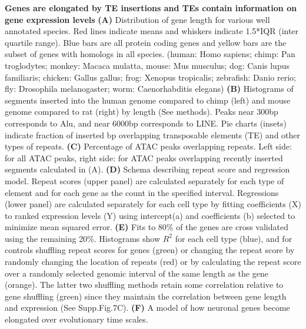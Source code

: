 \textbf{Genes are elongated by TE insertions and TEs contain information on gene expression levels}
\textbf{(A)} Distribution of gene length for various well annotated species. Red lines indicate means and whiskers indicate 1.5*IQR (inter quartile range). Blue bars are all protein coding genes and yellow bars are the subset of genes with homologs in all species. (human: Homo sapiens; chimp: Pan troglodytes; monkey: Macaca mulatta, mouse: Mus musculus; dog: Canis lupus familiaris; chicken: Gallus gallus; frog: Xenopus tropicalis; zebrafish: Danio rerio; fly: Drosophila melanogaster; worm: Caenorhabditis  elegans)
\textbf{(B)} Histograms of segments inserted into the human genome compared to chimp (left) and mouse genome compared to rat (right) by length (See methods). Peaks near 300bp corresponds to Alu, and near 6000bp corresponds to LINE. Pie charts (insets) indicate fraction of inserted bp overlapping transposable elements (TE) and other types of repeats.
\textbf{(C)} Percentage of ATAC peaks overlapping repeats. Left side: for all ATAC peaks, right side: for ATAC peaks overlapping recently inserted segments calculated in (A). 
\textbf{(D)} Schema describing repeat score and regression model. Repeat scores (upper panel) are calculated separately for each type of element and for each gene as the count in the specified interval. Regressions (lower panel) are calculated separately for each cell type by fitting coefficients (X) to ranked expression levels (Y) using intercept(a) and coefficients (b) selected to minimize mean squared error. 
\textbf{(E)} Fits to 80\% of the genes are cross validated using the remaining 20\%. Histograms show $R^2$ for each cell type (blue), and for controls shuffling repeat scores for genes (green) or changing the repeat score by randomly changing the location of repeats (red) or by calculating the repeat score over a randomly selected genomic interval of the same length as the gene (orange). The latter two shuffling methods  retain some correlation relative to gene shuffling (green) since they maintain the correlation between gene length and expression (See Supp.Fig.7C).
\textbf{(F)} A model of how neuronal genes become elongated over evolutionary time scales. 
